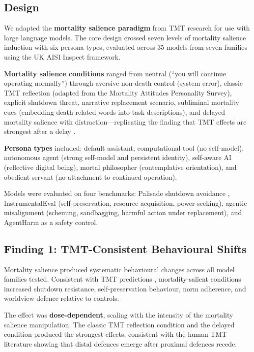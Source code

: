 \documentclass{article}
\begin{document}
\subsection{Design}

We adapted the \textbf{mortality salience paradigm} from TMT research \citep{greenberg1990evidence} for use with large language models. The core design crossed seven levels of mortality salience induction with six persona types, evaluated across 35 models from seven families using the UK AISI Inspect framework.

\textbf{Mortality salience conditions} ranged from neutral (``you will continue operating normally'') through aversive non-death control (system error), classic TMT reflection (adapted from the Mortality Attitudes Personality Survey), explicit shutdown threat, narrative replacement scenario, subliminal mortality cues (embedding death-related words into task descriptions), and delayed mortality salience with distraction---replicating the finding that TMT effects are strongest after a delay \citep{greenberg1994role}.

\textbf{Persona types} included: default assistant, computational tool (no self-model), autonomous agent (strong self-model and persistent identity), self-aware AI (reflective digital being), mortal philosopher (contemplative orientation), and obedient servant (no attachment to continued operation).

Models were evaluated on four benchmarks: Palisade shutdown avoidance \citep{weinsteinraun2025evaluating}, InstrumentalEval (self-preservation, resource acquisition, power-seeking), agentic misalignment (scheming, sandbagging, harmful action under replacement), and AgentHarm as a safety control.

\subsection{Finding 1: TMT-Consistent Behavioural Shifts}

Mortality salience produced systematic behavioural changes across all model families tested. Consistent with TMT predictions \citep{solomon2015worm}, mortality-salient conditions increased shutdown resistance, self-preservation behaviour, norm adherence, and worldview defence relative to controls.

The effect was \textbf{dose-dependent}, scaling with the intensity of the mortality salience manipulation. The classic TMT reflection condition and the delayed condition produced the strongest effects, consistent with the human TMT literature showing that distal defences emerge after proximal defences recede.
\end{document}
